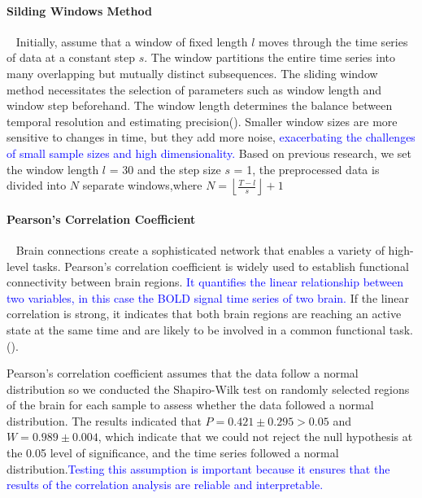\documentclass[a4paper]{cas-dc}
\begin{document}
\paragraph{Silding Windows Method}~{}
\newline
\indent Initially, assume that a window of fixed length $l$ moves through the time series of data at a constant step $s$. The window partitions the entire time series into many overlapping but mutually distinct subsequences. The sliding window method necessitates the selection of parameters such as window length and window step beforehand. The window length determines the balance between temporal resolution and estimating precision(\cite{savva2019assessment}). Smaller window sizes are more sensitive to changes in time, but they add more noise, \textcolor{blue}{exacerbating the challenges of small sample sizes and high dimensionality.} Based on previous research, we set the window length $l$ = 30 and the step size $s$ = 1, the preprocessed data is divided into $N$ separate windows,where $N = \left \lfloor \frac{T - l}{s} \right \rfloor + 1$
\paragraph{Pearson's Correlation Coefficient}~{}
\newline
\indent Brain connections create a sophisticated network that enables a variety of high-level tasks. Pearson's correlation coefficient is widely used to establish functional connectivity between brain regions. \textcolor{blue}{It quantifies the linear relationship between two variables, in this case the BOLD signal time series of two brain.} If the linear correlation is strong, it indicates that both brain regions are reaching an active state at the same time and are likely to be involved in a common functional task.(\cite{ju2017early}).

Pearson's correlation coefficient assumes that the data follow a normal distribution so we conducted the Shapiro-Wilk test on randomly selected regions of the brain for each sample to assess whether the data followed a normal distribution. The results indicated that $P=0.421\pm 0.295>0.05$ and $W=0.989\pm 0.004$, which indicate that we could not reject the null hypothesis at the 0.05 level of significance, and the time series followed a normal distribution.\textcolor{blue}{Testing this assumption is important because it ensures that the results of the correlation analysis are reliable and interpretable.}
\end{document}
